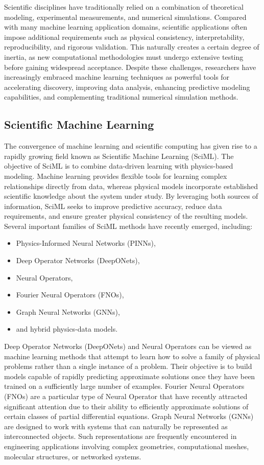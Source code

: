 Scientific disciplines have traditionally relied on a combination of theoretical modeling, experimental measurements, and numerical simulations. Compared with many machine learning application domains, scientific applications often impose additional requirements such as physical consistency, interpretability, reproducibility, and rigorous validation. This naturally creates a certain degree of inertia, as new computational methodologies must undergo extensive testing before gaining widespread acceptance. Despite these challenges, researchers have increasingly embraced machine learning techniques as powerful tools for accelerating discovery, improving data analysis, enhancing predictive modeling capabilities, and complementing traditional numerical simulation methods.

\subsection{Scientific Machine Learning}

The convergence of machine learning and scientific computing has given rise to a rapidly growing field known as Scientific Machine Learning (SciML). The objective of SciML is to combine data-driven learning with physics-based modeling. Machine learning provides flexible tools for learning complex relationships directly from data, whereas physical models incorporate established scientific knowledge about the system under study. By leveraging both sources of information, SciML seeks to improve predictive accuracy, reduce data requirements, and ensure greater physical consistency of the resulting models. Several important families of SciML methods have recently emerged, including:

\begin{itemize}
\item Physics-Informed Neural Networks (PINNs),
\item Deep Operator Networks (DeepONets),
\item Neural Operators,
\item Fourier Neural Operators (FNOs),
\item Graph Neural Networks (GNNs),
\item and hybrid physics-data models.
\end{itemize}

Deep Operator Networks (DeepONets) and Neural Operators can be viewed as machine learning methods that attempt to learn how to solve a family of physical problems rather than a single instance of a problem. Their objective is to build models capable of rapidly predicting approximate solutions once they have been trained on a sufficiently large number of examples. Fourier Neural Operators (FNOs) are a particular type of Neural Operator that have recently attracted significant attention due to their ability to efficiently approximate solutions of certain classes of partial differential equations. Graph Neural Networks (GNNs) are designed to work with systems that can naturally be represented as interconnected objects. Such representations are frequently encountered in engineering applications involving complex geometries, computational meshes, molecular structures, or networked systems.

